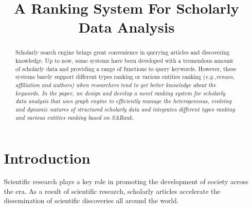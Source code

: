 \documentclass[conference]{IEEEtran}
\begin{document}
\title{A Ranking System For Scholarly Data Analysis}

\author{
\and
{}
\and
{}
}

\maketitle


\begin{abstract}
Scholarly search engine brings great convenience in querying articles and discovering knowledge. Up to now, some systems have been developed with a tremendous amount of scholarly data and providing a range of functions to query keywords. However, these systems barely support different types ranking or various entities ranking (\itshape e.g.,\upshape venues, affiliation and authors) when researchers tend to get better knowledge about the keywords. In the paper, we design and develop a novel ranking system for scholarly data analysis that uses graph engine to efficiently manage the heterogeneous, evolving and dynamic natures of structured scholarly data and integrates different types ranking and various entities ranking based on SARank.
\end{abstract}


\IEEEpeerreviewmaketitle


\section{Introduction}
\par
Scientific research plays a key role in promoting the development of society across the era. As a result of scientific research, scholarly articles accelerate the dissemination of scientific discoveries all around the world.
\end{document}
